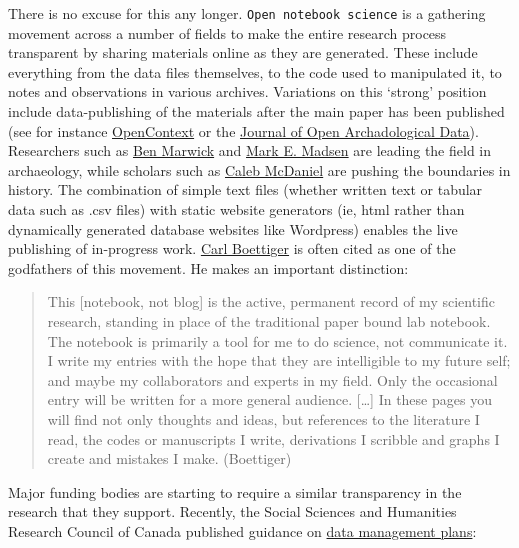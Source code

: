 \documentclass[english,]{book}
\begin{document}
There is no excuse for this any longer. \texttt{Open\ notebook\ science}
is a gathering movement across a number of fields to make the entire
research process transparent by sharing materials online as they are
generated. These include everything from the data files themselves, to
the code used to manipulated it, to notes and observations in various
archives. Variations on this `strong' position include data-publishing
of the materials after the main paper has been published (see for
instance \href{http://opencontext.org}{OpenContext} or the
\href{http://openarchaeologydata.metajnl.com/}{Journal of Open
Archadological Data}). Researchers such as
\href{https://faculty.washington.edu/bmarwick/}{Ben Marwick} and
\href{http://notebook.madsenlab.org/labnotebook.html}{Mark E. Madsen}
are leading the field in archaeology, while scholars such as
\href{http://wcm1.web.rice.edu/open-notebook-history.html}{Caleb
McDaniel} are pushing the boundaries in history. The combination of
simple text files (whether written text or tabular data such as .csv
files) with static website generators (ie, html rather than dynamically
generated database websites like Wordpress) enables the live publishing
of in-progress work.
\href{http://www.carlboettiger.info/2012/09/28/Welcome-to-my-lab-notebook.html}{Carl
Boettiger} is often cited as one of the godfathers of this movement. He
makes an important distinction:

\begin{quote}
This {[}notebook, not blog{]} is the active, permanent record of my
scientific research, standing in place of the traditional paper bound
lab notebook. The notebook is primarily a tool for me to do science, not
communicate it. I write my entries with the hope that they are
intelligible to my future self; and maybe my collaborators and experts
in my field. Only the occasional entry will be written for a more
general audience. {[}\ldots{}{]} In these pages you will find not only
thoughts and ideas, but references to the literature I read, the codes
or manuscripts I write, derivations I scribble and graphs I create and
mistakes I make. (Boettiger)
\end{quote}

Major funding bodies are starting to require a similar transparency in
the research that they support. Recently, the Social Sciences and
Humanities Research Council of Canada published guidance on
\href{http://www.sshrc-crsh.gc.ca/about-au_sujet/policies-politiques/statements-enonces/edata-donnees_electroniques-eng.aspx}{data
management plans}:
\end{document}
